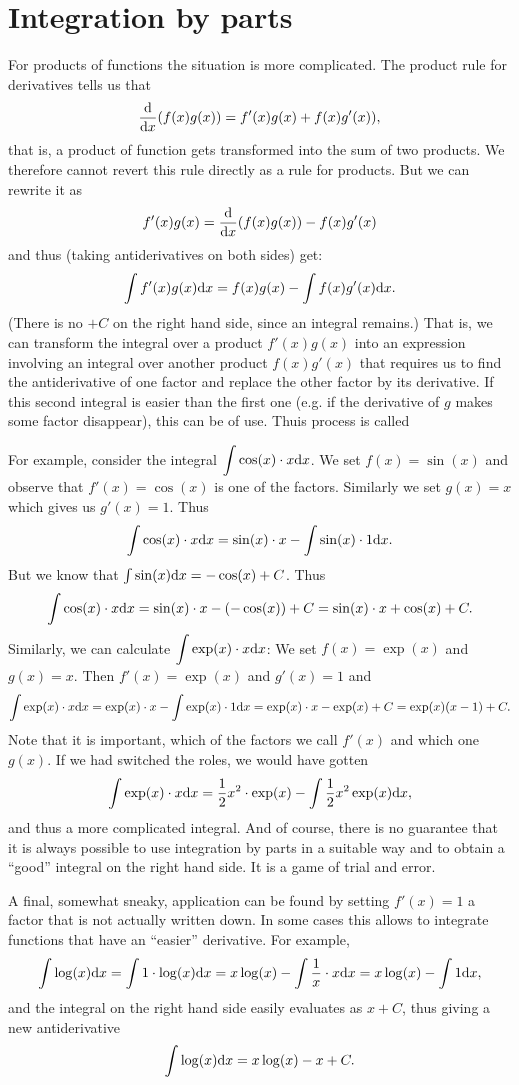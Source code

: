 \section{Integration by parts}

For products of functions the situation is more complicated. The product
rule for derivatives tells us that 
\[
\frac{\mbox{d}}{\mbox{d}x} (f(x)g(x))=f'(x)g(x)+f(x)g'(x)),
\]
that is, a product of function gets transformed into the sum of two
products. We therefore cannot revert this rule directly as a rule for
products. But we can rewrite it as
\[
f'(x)g(x)= \frac{\mbox{d}}{\mbox{d}x} (f(x)g(x))-f(x)g'(x)
\]
and thus (taking antiderivatives on both sides) get:
\[
\int f'(x)g(x){\mbox{d}}x=f(x)g(x)-\int f(x)g'(x){\mbox{d}}x.
\]
(There is no $+C$ on the right hand side, since an integral remains.)
That is, we can transform the integral over a product $f'(x)g(x)$ into an
expression involving an integral over another product $f(x)g'(x)$ that
requires us to find the antiderivative of one factor and replace the other
factor by its derivative. If this second integral is easier than the first
one (e.g. if the derivative of $g$ makes some factor disappear), this can be of
use. Thuis process is called 

For example, consider the integral
$\displaystyle\int \cos(x)\cdot x{\mbox{d}}x$. We set $f(x)=\sin(x)$ and observe
that $f'(x)=\cos(x)$ is one of the factors. Similarly we set $g(x)=x$ which
gives us $g'(x)=1$. Thus
\[
\int\cos(x)\cdot x{\mbox{d}}x=\sin(x)\cdot x-\int \sin(x)\cdot 1{\mbox{d}}x.
\]
But we know that $\int\sin(x){\mbox{d}}x=-\cos(x)+C$. Thus
\[
\int\cos(x)\cdot x{\mbox{d}}x=\sin(x)\cdot x-(-\cos(x))+C=\sin(x)\cdot
x+\cos(x)+C.
\]
Similarly, we can calculate $\displaystyle\int \exp(x)\cdot x{\mbox{d}}x$:
We set $f(x)=\exp(x)$ and
$g(x)=x$. Then $f'(x)=\exp(x)$ and $g'(x)=1$ and
\[
\int\exp(x)\cdot x{\mbox{d}}x=\exp(x)\cdot x-\int \exp(x)\cdot
1{\mbox{d}}x=\exp(x)\cdot x-\exp(x)+C=\exp(x)(x-1)+C.
\]
Note that it is important, which of the factors we call $f'(x)$ and which
one $g(x)$. If we had switched the roles, we would have gotten
\[
\int\exp(x)\cdot x{\mbox{d}}x=\frac{1}{2}x^2\cdot \exp(x)
-\int \frac{1}{2}x^2\exp(x){\mbox{d}}x,
\]
and thus a more complicated integral. And of course, there is no guarantee
that it is always possible to use integration by parts in a suitable way and
to obtain a ``good'' integral on the right hand side. It is a game of trial
and error.

A final, somewhat sneaky, application can be found by setting $f'(x)=1$ a
factor that is not actually written down. In some cases this allows to
integrate functions that have an ``easier'' derivative. For example,
\[
\int \log(x){\mbox{d}}x=\int 1\cdot \log(x){\mbox{d}}x
=x\log(x)-\int \frac{1}{x}\cdot x{\mbox{d}}x
=x\log(x)-\int 1{\mbox{d}}x,
\]
and the integral on the right hand side easily evaluates as $x+C$,
thus giving a new antiderivative
\[
\int\log(x){\mbox{d}}x=x\log(x)-x+C.
\]

